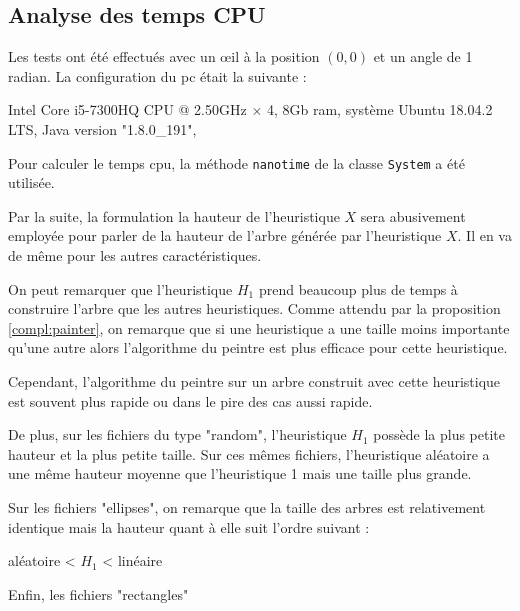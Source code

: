 \subsection{Analyse des temps CPU}
Les tests ont été effectués avec un \oe{}il à la position $(0,0)$ et un
angle de 1 radian.
La configuration du pc était la suivante :

\begin{center}
  Intel Core i5-7300HQ CPU @ 2.50GHz $\times$ 4,  8Gb ram, système Ubuntu 18.04.2 LTS,
  Java version "1.8.0\_191",
\end{center}
Pour calculer le temps cpu, la méthode \texttt{nanotime} de la classe
\texttt{System} a été utilisée.

Par la suite, la formulation la hauteur de l'heuristique $X$ sera abusivement
employée pour parler de la hauteur de l'arbre générée par l'heuristique $X$.
Il en va de même pour les autres caractéristiques.

On peut remarquer que l'heuristique $H_1$ prend beaucoup plus de
temps à construire l'arbre que les autres heuristiques.
Comme attendu par la proposition \ref{compl:painter}, on remarque
que si une heuristique a une taille moins importante qu'une autre
alors l'algorithme du peintre est plus efficace pour cette heuristique.

Cependant, l'algorithme du peintre sur un arbre construit
avec cette heuristique est souvent plus rapide ou dans le
pire des cas aussi rapide.

De plus, sur les fichiers du type "random", l'heuristique $H_1$
possède la plus petite hauteur et la plus petite taille.
Sur ces mêmes fichiers, l'heuristique aléatoire  a une même hauteur moyenne
que l'heuristique 1 mais une taille plus grande.

Sur les fichiers "ellipses", on remarque que la taille des arbres
est relativement identique mais la hauteur quant à elle suit l'ordre suivant :

\begin{center}
  aléatoire < $H_1$ < linéaire
\end{center}

Enfin, les fichiers "rectangles"



